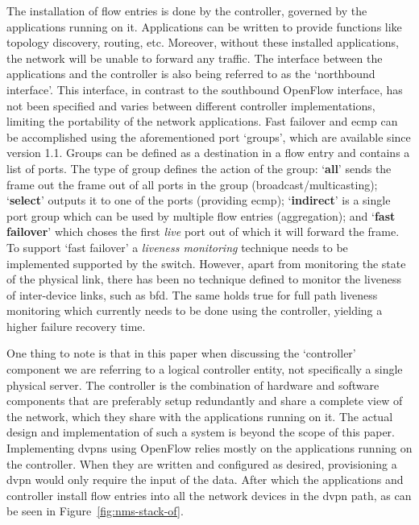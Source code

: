 The installation of flow entries is done by the controller, governed by the applications running on it. Applications can be written to provide functions like topology discovery, routing, etc. Moreover, without these installed applications, the network will be unable to forward any traffic. The interface between the applications and the controller is also being referred to as the `northbound interface'. This interface, in contrast to the southbound OpenFlow interface, has not been specified and varies between different controller implementations, limiting the portability of the network applications.
Fast failover and \ac{ecmp} can be accomplished using the aforementioned port `groups', which are available since version 1.1. Groups can be defined as a destination in a flow entry and contains a list of ports. The type of group defines the action of the group: `\textbf{all}' sends the frame out the frame out of all ports in the group (broadcast/multicasting); `\textbf{select}' outputs it to one of the ports (providing \ac{ecmp}); `\textbf{indirect}' is a single port group which can be used by multiple flow entries (aggregation); and `\textbf{fast failover}' which choses the first \textsl{live} port out of which it will forward the frame. To support `fast failover' a \textsl{liveness monitoring} technique needs to be implemented supported by the switch. However, apart from monitoring the state of the physical link, there has been no technique defined to monitor the liveness of inter-device links, such as \ac{bfd}. The same holds true for full path liveness monitoring which currently needs to be done using the controller, yielding a higher failure recovery time.

One thing to note is that in this paper when discussing the `controller' component we are referring to a logical controller entity, not specifically a single physical server. The controller is the combination of hardware and software components that are preferably setup redundantly and share a complete view of the network, which they share with the applications running on it. The actual design and implementation of such a system is beyond the scope of this paper.
Implementing \acp{dvpn} using OpenFlow relies mostly on the applications running on the controller. When they are written and configured as desired, provisioning a \ac{dvpn} would only require the input of the data. After which the applications and controller install flow entries into all the network devices in the \ac{dvpn} path, as can be seen in Figure~\ref{fig:nms-stack-of}.

